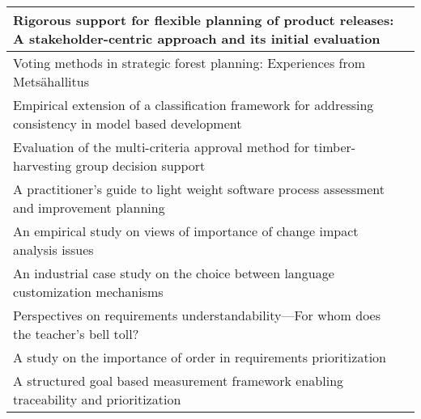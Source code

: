 \begin{center}
{\begin{tabular}{
|>{\raggedright}p{}
|>{\raggedright}p{}
|}
Rigorous support for flexible planning of product releases: A stakeholder-centric approach and its initial evaluation & \citet{Heikkila2010}\tabularnewline \hline
Voting methods in strategic forest planning: Experiences from Mets\"{a}hallitus & \citet{Hiltunen2008}\tabularnewline \hline
Empirical extension of a classification framework for addressing consistency in model based development & \citet{Kuzniarz2010}\tabularnewline \hline
Evaluation of the multi-criteria approval method for timber-harvesting group decision support & \citet{Laukkanen2005a} \tabularnewline \hline
A practitioner's guide to light weight software process assessment and improvement planning & \citet{Pettersson2008} \tabularnewline \hline
An empirical study on views of importance of change impact analysis issues & \citet{Rovegard2008} \tabularnewline \hline
An industrial case study on the choice between language customization mechanisms & \citet{Staron2006} \tabularnewline \hline
Perspectives on requirements understandability---For whom does the teacher's bell toll? & \citet{Svahnberg2008} \tabularnewline \hline
A study on the importance of order in requirements prioritization & \citet{Svahnberg2009} \tabularnewline \hline
A structured goal based measurement framework enabling traceability and prioritization & \citet{Touseef2010} \tabularnewline \hline

\end{tabular}
} %
\end{center}
